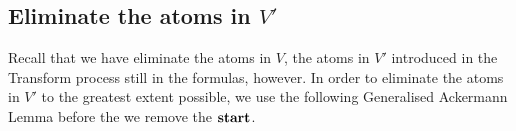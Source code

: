 \documentclass[letterpaper]{article}
\begin{document}
\subsection{Eliminate the atoms in $V'$}

Recall that we have eliminate the atoms in $V$, the atoms in $V'$ introduced in the Transform process still in the formulas, however. In order to eliminate the atoms in $V'$ to the greatest extent possible, we use the following Generalised Ackermann Lemma before the we remove the $\textbf{start}$.
\end{document}

